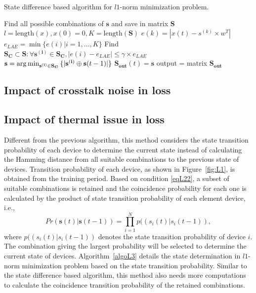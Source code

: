 \begin{algorithm}
\caption{State difference based algorithm for $l1$-norm minimization problem.}\label{algoL2}
\begin{algorithmic}[1]
\State Find all possible combinations of $\mathbf{s}$ and save in matrix $\mathbf{S}$
\State $l = \text{length}(x),x(0) = 0,K=\text{length}(\mathbf{S})$
	        \State $e(k) = |x(t)-s^{(k)}\times w^T|$
	    \EndFor
		\State $e_{LAE} = \min{\{e(i)|i=1,\ldots,K\}}$
		\State Find $\mathbf{S_C}\subset \mathbf{S}: \forall \mathbf{s^{(i)}}\in \mathbf{S_C},|e(i)-e_{LAE}|\leq \gamma \times e_{LAE}$
		\State $\mathbf{s} = \operatorname*{arg\,min}_{\mathbf{s^{(i)}}\in \mathbf{S_C}}{\{|\mathbf{s^{(i)}}\oplus \mathbf{s}(t-1)|\}}$
		\State $\mathbf{S_{out}}(t) = \mathbf{s}$ 
	\EndFor
\State output = matrix $\mathbf{S_{out}}$
\EndFunction
\end{algorithmic}
\end{algorithm}





\subsection{Impact of crosstalk noise in loss}
\subsection{Impact of thermal issue in loss}\label{IoTherm}
Different from the previous algorithm, this method considers the state transition probability of each device to determine the current state instead of calculating the Hamming distance from all suitable combinations to the previous state of devices. Transition probability of each device, as shown in Figure~\ref{fig:L1}, is obtained from the training period. Based on condition \eqref{eqL22}, a subset of suitable combinations is retained and the coincidence probability for each one is calculated by the product of state transition probability of each element device, i.e.,
\begin{equation}\label{eqL5}
Pr(\mathbf{s}(t)|\mathbf{s}(t-1)) = \prod_{i=1}^{N}{p((s_i(t)|s_i(t-1))},
\end{equation}
where $p((s_i(t)|s_i(t-1))$ denotes the state transition probability of device $i$. The combination giving the largest probability will be selected to determine the current state of devices. Algorithm~\ref{algoL3} details the state determination in $l1$-norm minimization problem based on the state transition probability.
Similar to the state difference based algorithm, this method also needs more computations to calculate the coincidence transition probability of the retained combinations.

